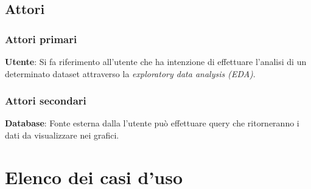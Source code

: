 \documentclass[../analisi-dei-requisiti.tex]{subfiles}
\begin{document}
%
\subsection{Attori}%
\label{subs:attori}

\subsubsection{Attori primari}%
\label{sssec:attori_primari}
\begin{description}
 \item \textbf{Utente}: Si fa riferimento all'utente che ha intenzione di effettuare l'analisi di un determinato dataset attraverso la \emph{exploratory data analysis (EDA)}.
\end{description}

\subsubsection{Attori secondari}
\label{sssec:attori_secondari}
\begin{description}
    \item \textbf{Database}: Fonte esterna dalla l'utente può effettuare query che ritorneranno i dati da visualizzare nei grafici.
\end{description}

\newpage
\section{Elenco dei casi d'uso}
\label{subs:elenco_dei_casi_duso}







\end{document}
